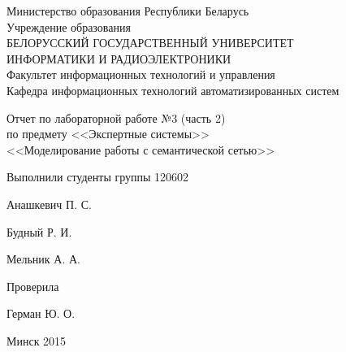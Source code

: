 \thispagestyle{empty}
\setlength{\parindent}{0ex} %

\begin{center}
  Министерство образования Республики Беларусь \\
  \smallskip
  Учреждение образования \\
  БЕЛОРУССКИЙ ГОСУДАРСТВЕННЫЙ УНИВЕРСИТЕТ \\
  ИНФОРМАТИКИ И РАДИОЭЛЕКТРОНИКИ \\
  \smallskip
  Факультет информационных технологий и управления \\
  \smallskip
  Кафедра информационных технологий автоматизированных систем
\end{center}

\vspace{40mm}

\begin{center}
  Отчет по лабораторной работе №3 (часть 2) \\
  по предмету <<Экспертные системы>> \\
  <<Моделирование работы с семантической сетью>> 
\end{center}

\vspace{45mm}

\begin{minipage}{.55\linewidth}
    Выполнили студенты группы 120602
    \vspace{12mm}
\end{minipage}
\hfill
\begin{minipage}{.4\linewidth}
  \begin{flushright}
    Анашкевич П. С.

    Будный Р. И.

    Мельник А. А.
  \end{flushright}
\end{minipage}

\vspace{10mm}

\begin{minipage}{.55\linewidth}
    Проверила
\end{minipage}
\hfill
\begin{minipage}{.4\linewidth}
  \begin{flushright}
    Герман Ю. О.

  \end{flushright}
\end{minipage}

\vspace{40mm}
\begin{center}
  Минск 2015
\end{center}

\setlength{\parindent}{5ex} %
